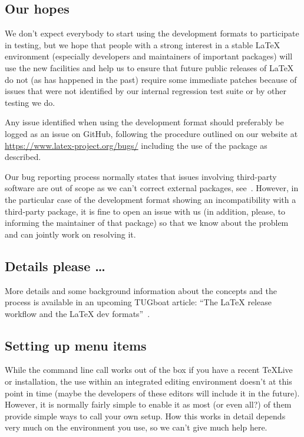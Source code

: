 \documentclass{ltnews}
\providecommand\MiKTeX{\hologo{MiKTeX}}
\providecommand\TL{\TeX{}Live}
\begin{document}
\subsection{Our hopes}

We don’t expect everybody to start using the development formats to
participate in testing, but we hope that people with a strong interest
in a stable \LaTeX{} environment (especially developers and maintainers
of important packages) will use the new facilities and help us to
ensure that future public releases of \LaTeX{} do not (as has happened in
the past) require some immediate patches because of issues that were
not identified by our internal regression test suite or by other
testing
we do.

Any issue identified when using the development format should
preferably be logged as an issue on GitHub, following the procedure
outlined on our website at \url{https://www.latex-project.org/bugs/}
including the use of the  package as described.

Our bug reporting process normally states that issues involving
third-party software are out of scope as we can’t correct external
packages, see~\cite{30:Mittelbach:TB39-1}. However, in the particular
case of the development format showing an incompatibility with a
third-party package, it is fine to open an issue with us (in addition,
please, to informing the maintainer of that package) so that we know
about the problem and can jointly work on resolving it.

\subsection{Details please \ldots}

More details and some background information about the concepts and
the process is available in an upcoming TUGboat article: \enquote{The
  \LaTeX{} release workflow and the \LaTeX{} dev
  formats}~\cite{devformat}.

\subsection{Setting up menu items}

While the command line call works out of the box if you have a recent  
\TL{} or \MiKTeX{} installation, the use within an integrated
editing environment doesn’t at this point in time (maybe the
developers of these editors will include it in the future). However,
it is normally fairly simple to enable it as most (or even all?) of
them provide simple ways to call your own setup. How this works in
detail depends very much on the environment you use, so we can’t give
much help here.
\end{document}
